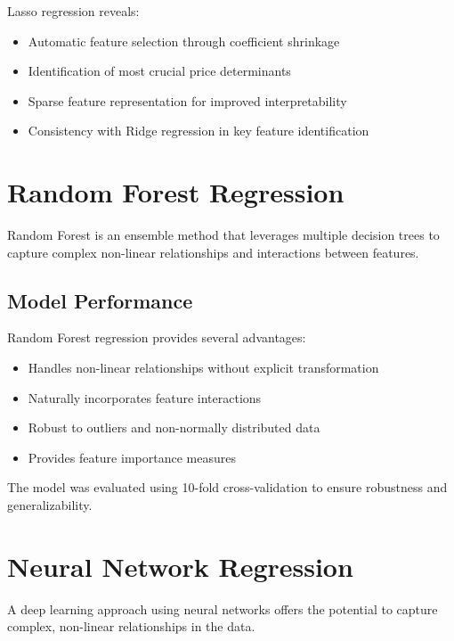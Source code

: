 Lasso regression reveals:
\begin{itemize}
    \item Automatic feature selection through coefficient shrinkage
    \item Identification of most crucial price determinants
    \item Sparse feature representation for improved interpretability
    \item Consistency with Ridge regression in key feature identification
\end{itemize}

\section{Random Forest Regression}
Random Forest is an ensemble method that leverages multiple decision trees to capture complex non-linear relationships and interactions between features.

\subsection{Model Performance}
Random Forest regression provides several advantages:
\begin{itemize}
    \item Handles non-linear relationships without explicit transformation
    \item Naturally incorporates feature interactions
    \item Robust to outliers and non-normally distributed data
    \item Provides feature importance measures
\end{itemize}

The model was evaluated using 10-fold cross-validation to ensure robustness and generalizability.

\section{Neural Network Regression}
A deep learning approach using neural networks offers the potential to capture complex, non-linear relationships in the data.

